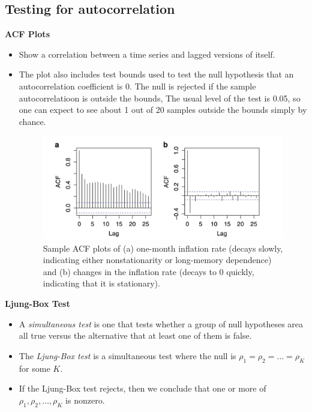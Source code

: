 \documentclass[11pt]{article}
\begin{document}
\subsection{Testing for autocorrelation}
\textbf{ACF Plots}
\begin{itemize}
    \item Show a correlation between a time series and lagged versions of itself. 
    \item The plot also includes test bounds used to test the null hypothesis that an 
    autocorrelation coefficient is 0. The null is rejected if the sample autocorrelatioon is
    outside the bounds, The usual level of the test is 0.05, so one can expect to see about 1
    out of 20 samples outside the bounds simply by chance. 

    \begin{figure}[H] 
        \centering 
        \includegraphics[width=5in]{imgs/acf_plots.png}
        \caption{Sample ACF plots of (a) one-month inflation rate (decays slowly, indicating 
        either nonstationarity or long-memory dependence) and (b) changes in the inflation rate
        (decays to 0 quickly, indicating that it is stationary).}
    \end{figure}

\end{itemize}

\textbf{Ljung-Box Test}
\begin{itemize}
    \item A \textit{simultaneous test} is one that tests whether a group of null hypotheses area
    all true versus the alternative that at least one of them is false.
    \item The \textit{Ljung-Box test} is a simultaneous test where the null is $\rho_1 = \rho_2
    = \hdots =\rho_K$ for some $K$. 
    \item If the Ljung-Box test rejects, then we conclude that one or more of $\rho_1, \rho_2, 
    \ldots, \rho_K$ is nonzero. 
\end{itemize}
\end{document}
